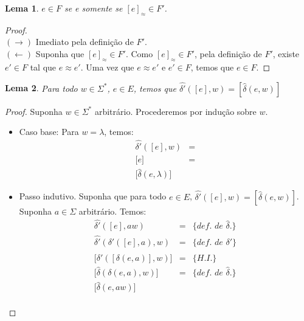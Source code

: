 \documentclass[a4paper]{article}
\newtheorem{Lemma}{Lema}
\theoremstyle{definition}
\begin{document}
  \begin{Lemma}\label{lemma136}
    $e \in F$ se e somente se $[e]_\approx \in F'$.
  \end{Lemma}
  \begin{proof}$\,\,\,$\\
    $(\to)$ Imediato pela definição de $F'$. \\
    $(\leftarrow)$ Suponha que $[e]_\approx \in F'$. Como $[e]_\approx \in F'$, pela definição
    de $F'$, existe $e' \in F$ tal que $e \approx e'$. Uma vez que $e \approx
    e'$ e $e' \in F$, temos que $e \in F$.
  \end{proof}

  \begin{Lemma}\label{lemma137}
    Para todo $w \in \Sigma^*$, $e\in E$, temos que
    $\widehat{\delta'}([e],w) = [\widehat{\delta}(e,w)]$
  \end{Lemma}
  \begin{proof}
    Suponha $w\in\Sigma^*$ arbitrário. Procederemos por indução sobre $w$.
    \begin{itemize}
    \item Caso base: Para $w = \lambda$, temos:
      \[
        \begin{array}{lc}
          \widehat{\delta'}([e],w) & = \\
         \lbrack e \rbrack & = \\
          \lbrack \widehat{\delta}(e,\lambda) \rbrack
        \end{array}
      \]
     \item Passo indutivo. Suponha que para todo $e\in E$, $\widehat{\delta'}([e],w) =
       [\widehat{\delta}(e,w)]$. Suponha $a \in \Sigma$ arbitrário. Temos:
       \[
         \begin{array}{lcl}
           \widehat{\delta'}([e],aw) & = & \{\textit{def. de }\widehat{\delta}.\}\\
           \widehat{\delta'}(\delta'([e],a),w) & = &  \{\textit{def. de } \delta'\}\\
           \lbrack\widehat{\delta'}([\delta(e,a)],w)\rbrack & = & \{H.I.\}\\ 
           \lbrack\widehat{\delta}(\delta(e,a),w)\rbrack  & = & \{\textit{def. de }\widehat{\delta}.\}\\
           \lbrack\widehat{\delta}(e,aw)\rbrack \\
         \end{array}
       \]
    \end{itemize}
  \end{proof}
\end{document}
